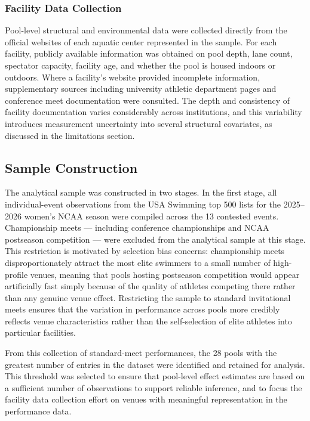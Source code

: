 \documentclass[12pt]{article}
\begin{document}
\subsubsection{Facility Data Collection}

Pool-level structural and environmental data were collected directly from the
official websites of each aquatic center represented in the sample. For each
facility, publicly available information was obtained on pool depth, lane count,
spectator capacity, facility age, and whether the pool is housed indoors or
outdoors. Where a facility's website provided incomplete information,
supplementary sources including university athletic department pages and
conference meet documentation were consulted. The depth and consistency of
facility documentation varies considerably across institutions, and this
variability introduces measurement uncertainty into several structural
covariates, as discussed in the limitations section.

\subsection{Sample Construction}

The analytical sample was constructed in two stages. In the first stage, all
individual-event observations from the USA Swimming top 500 lists for the
2025--2026 women's NCAA season were compiled across the 13 contested events.
Championship meets --- including conference championships and NCAA postseason
competition --- were excluded from the analytical sample at this stage. This
restriction is motivated by selection bias concerns: championship meets
disproportionately attract the most elite swimmers to a small number of
high-profile venues, meaning that pools hosting postseason competition would
appear artificially fast simply because of the quality of athletes competing
there rather than any genuine venue effect. Restricting the sample to standard
invitational meets ensures that the variation in performance across pools more
credibly reflects venue characteristics rather than the self-selection of elite
athletes into particular facilities.

From this collection of standard-meet performances, the 28 pools with the
greatest number of entries in the dataset were identified and retained for
analysis. This threshold was selected to ensure that pool-level effect estimates
are based on a sufficient number of observations to support reliable inference,
and to focus the facility data collection effort on venues with meaningful
representation in the performance data.
\end{document}
